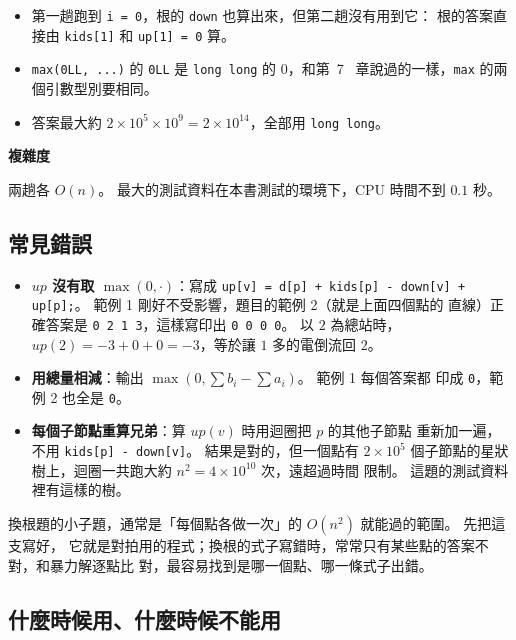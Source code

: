 \begin{itemize}
\item 第一趟跑到 \texttt{i = 0}，根的 \texttt{down} 也算出來，但第二趟沒有用到它：
根的答案直接由 \texttt{kids[1]} 和 \texttt{up[1] = 0} 算。
\item \texttt{max(0LL, ...)} 的 \texttt{0LL} 是 \texttt{long long} 的 $0$，和第~7
~章說過的一樣，\texttt{max} 的兩個引數型別要相同。
\item 答案最大約 $2 \times 10^5 \times 10^9 = 2 \times 10^{14}$，全部用
\texttt{long long}。
\end{itemize}

\textbf{複雜度}

兩趟各 $O(n)$。 最大的測試資料在本書測試的環境下，CPU 時間不到 $0.1$ 秒。

\subsection{常見錯誤}

\begin{itemize}
\item \textbf{$\mathit{up}$ 沒有取 $\max(0, \cdot)$}：寫成 \texttt{up[v] = d[p] +
kids[p] - down[v] + up[p];}。 範例 1 剛好不受影響，題目的範例 2（就是上面四個點的
直線）正確答案是 \texttt{0 2 1 3}，這樣寫印出 \texttt{0 0 0 0}。 以 $2$ 為總站時，
$\mathit{up}(2) = -3 + 0 + 0 = -3$，等於讓 $1$ 多的電倒流回 $2$。
\item \textbf{用總量相減}：輸出 $\max(0, \sum b_i - \sum a_i)$。 範例 1 每個答案都
印成 \texttt{0}，範例 2 也全是 \texttt{0}。
\item \textbf{每個子節點重算兄弟}：算 $\mathit{up}(v)$ 時用迴圈把 $p$ 的其他子節點
重新加一遍，不用 \texttt{kids[p] - down[v]}。 結果是對的，但一個點有 $2 \times
10^5$ 個子節點的星狀樹上，迴圈一共跑大約 $n^2 = 4 \times 10^{10}$ 次，遠超過時間
限制。 這題的測試資料裡有這樣的樹。
\end{itemize}

\begin{apcsnote}
換根題的小子題，通常是「每個點各做一次」的 $O(n^2)$ 就能過的範圍。 先把這支寫好，
它就是對拍用的程式；換根的式子寫錯時，常常只有某些點的答案不對，和暴力解逐點比
對，最容易找到是哪一個點、哪一條式子出錯。
\end{apcsnote}

\subsection{什麼時候用、什麼時候不能用}

